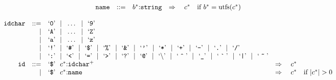 \vspace{1ex}

$$
\begin{array}[t]{@{}lrrl@{}l@{}l@{}l@{}}
& {\mathtt{name}} & ::= & {b^\ast}{:}{\mathtt{string}} & \quad\Rightarrow\quad{} & {c^\ast} & \quad \mbox{if}~ {b^\ast} = {\mathrm{utf{\kern-0.1em\scriptstyle 8}}}({c^\ast}) \\
\end{array}
$$

\vspace{1ex}

$$
\begin{array}[t]{@{}lrrl@{}l@{}l@{}l@{}}
& {\mathtt{idchar}} & ::= & \mbox{‘\texttt{0}’} ~~|~~ \ldots ~~|~~ \mbox{‘\texttt{9}’} \\
& & | & \mbox{‘\texttt{A}’} ~~|~~ \ldots ~~|~~ \mbox{‘\texttt{Z}’} \\
& & | & \mbox{‘\texttt{a}’} ~~|~~ \ldots ~~|~~ \mbox{‘\texttt{z}’} \\
& & | & \mbox{‘\texttt{!}’} ~~|~~ \mbox{‘\texttt{\#}’} ~~|~~ \mbox{‘\texttt{\$}’} ~~|~~ \mbox{‘\texttt{\%}’} ~~|~~ \mbox{‘\texttt{\&}’} ~~|~~ \mbox{‘\texttt{\kern0.03em{'}\kern0.03em}’} ~~|~~ \mbox{‘\texttt{*}’} ~~|~~ \mbox{‘\texttt{+}’} ~~|~~ \mbox{‘\texttt{{-}}’} ~~|~~ \mbox{‘\texttt{.}’} ~~|~~ \mbox{‘\texttt{/}’} \\
& & | & \mbox{‘\texttt{:}’} ~~|~~ \mbox{‘\texttt{{<}}’} ~~|~~ \mbox{‘\texttt{{=}}’} ~~|~~ \mbox{‘\texttt{{>}}’} ~~|~~ \mbox{‘\texttt{?}’} ~~|~~ \mbox{‘\texttt{@}’} ~~|~~ \mbox{‘\texttt{\(\mathtt{\backslash}\)}’} ~~|~~ \mbox{‘\texttt{\(\mathtt{\hat{~~}}\)}’} ~~|~~ \mbox{‘\texttt{\_}’} ~~|~~ \mbox{‘\texttt{\(\mathtt{\grave{~~}}\)}’} ~~|~~ \mbox{‘\texttt{|}’} ~~|~~ \mbox{‘\texttt{\(\mathtt{\tilde{~~}}\)}’} \\
& {\mathtt{id}} & ::= & \mbox{‘\texttt{\$}’}~~{c^\ast}{:}{{\mathtt{idchar}}^{+}} & \quad\Rightarrow\quad{} & {c^\ast} \\
& & | & \mbox{‘\texttt{\$}’}~~{c^\ast}{:}{\mathtt{name}} & \quad\Rightarrow\quad{} & {c^\ast} & \quad \mbox{if}~ {|{c^\ast}|} > 0 \\
\end{array}
$$

\vspace{1ex}

